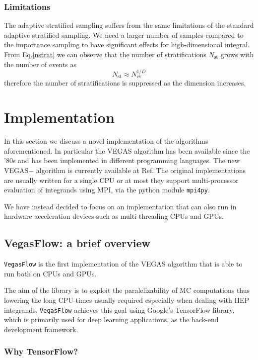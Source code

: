 \documentclass[../main/main.tex]{subfiles}
\begin{document}
\subsubsection{Limitations}
The adaptive stratified sampling suffers from the same limitations of the standard adaptive stratified sampling.
We need a larger number of samples compared to the importance sampling  to have significant effects for high-dimensional integral.
From Eq.\eqref{nstrat} we can observe that the number of stratifications $N_\text{st}$ grows with the number of events as 
\begin{equation}
	N_\text{st} \approx N_\text{ev}^{1/D}
\end{equation}
therefore the number of stratifications is suppressed as the dimension increases. 


 


\section{Implementation}
In this section we discuss a novel implementation of the algorithms aforementioned.
In particular the VEGAS algorithm has been available since the '80s and has been implemented in different programming languages.
The new VEGAS+ algorithm is currently available at Ref\cite{peter_lepage_2021_4746454}.
The original implementations are usually written for a single CPU or at most they support multi-processor evaluation of integrands using
MPI, via the python module \texttt{mpi4py}.

We have instead decided to focus on an implementation that can also run in hardware acceleration devices such as multi-threading CPUs and GPUs.

\subsection{VegasFlow: a brief overview}
\texttt{VegasFlow} \cite{vegasflow_package} is the first implementation of the VEGAS algorithm that is able to run both on CPUs and GPUs.
 
The aim of the library is to exploit the paralelizability of MC computations thus lowering the long CPU-times usually required especially when
dealing with HEP integrands.
 \texttt{VegasFlow} achieves this goal using Google's TensorFlow library, which is primarily used for deep learning applications, as the back-end development framework. 

\subsubsection{Why TensorFlow?}
\end{document}

